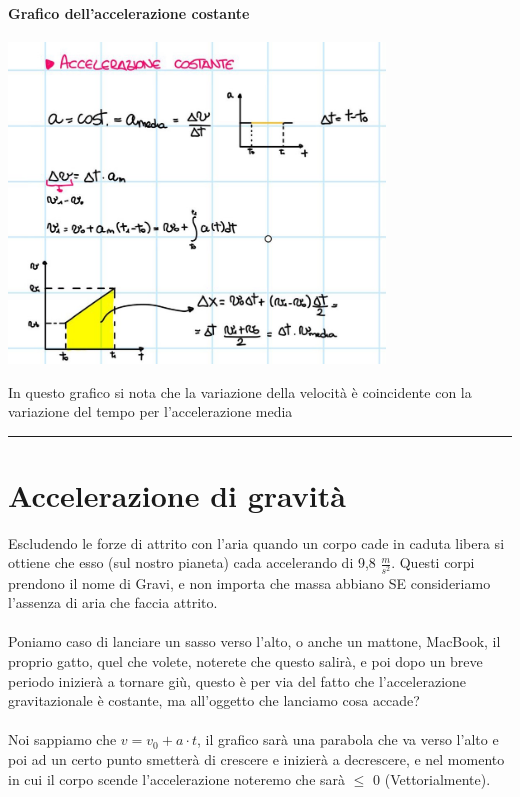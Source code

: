 \documentclass[12pt, a4paper, openany, oneside]{book}
\begin{document}
\paragraph{Grafico dell'accelerazione costante}
\begin{center}
\includegraphics[width=0.75\textwidth]{acostante}
\end{center}
In questo grafico si nota che la variazione della velocità è coincidente con
la variazione del tempo per l'accelerazione media \\
{\color{black} \rule{\linewidth}{0.3mm}}
\section{Accelerazione di gravità}
Escludendo le forze di attrito con l'aria quando un corpo cade in caduta libera
si ottiene che esso (sul nostro pianeta) cada accelerando di 9,8 $\frac{m}{s^{2}}$.
Questi corpi prendono il nome di Gravi, e non importa che massa abbiano SE 
consideriamo l'assenza di aria che faccia attrito.
\\ \\
Poniamo caso di lanciare un sasso verso l'alto, o anche un mattone, MacBook, il
proprio gatto, quel che volete, noterete che questo salirà, e poi dopo un breve
periodo inizierà a tornare giù, questo è per via del fatto che l'accelerazione
gravitazionale è costante, ma all'oggetto che lanciamo cosa accade?
\\ \\
Noi sappiamo che $v = v_{0} + a\cdot t$, il grafico sarà una parabola che va
verso l'alto e poi ad un certo punto smetterà di crescere e inizierà a 
decrescere, e nel momento in cui il corpo scende l'accelerazione noteremo che
sarà $\leq$ 0 (Vettorialmente).
\end{document}

